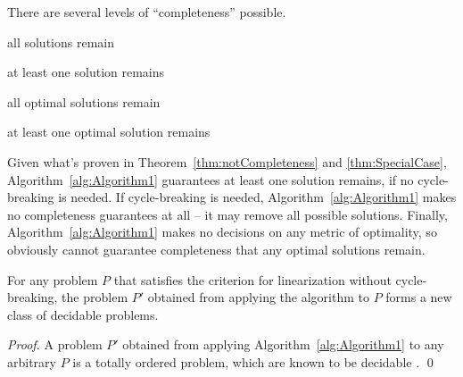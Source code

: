 \documentclass[runningheads]{llncs}
\begin{document}
There are several levels of \enquote{completeness} possible. 
	\begin{compactitem}
	\item all solutions remain 
	\item at least one solution remains 
	\item all optimal solutions remain
	\item at least one optimal solution remains 	
	\end{compactitem}
Given what's proven in Theorem~\ref{thm:notCompleteness} and \ref{thm:SpecialCase}, Algorithm~\ref{alg:Algorithm1} guarantees at least one solution remains, if no cycle-breaking is needed. If cycle-breaking is needed, Algorithm~\ref{alg:Algorithm1} makes no completeness guarantees at all -- it may remove all possible solutions. Finally, Algorithm~\ref{alg:Algorithm1} makes no decisions on any metric of optimality, so obviously cannot guarantee completeness that any optimal solutions remain.
  
  

\begin{theorem}\label{thm:newClass}
	For any problem $P$ that satisfies the criterion for linearization without cycle-breaking, the problem $P'$ obtained from applying the algorithm to $P$ forms a new class of decidable problems.
\end{theorem}
\begin{proof}
	A problem $P'$ obtained from applying Algorithm~\ref{alg:Algorithm1} to any arbitrary $P$ is a totally ordered problem, which are known to be decidable \cite{Alford2015TightHTNBounds}.  
	\qed
\end{proof}

\end{document}
